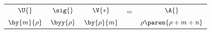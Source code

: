 \begin{table}[htdp]
\begin{center}
\begin{tabular}{ccccc}
%
  $\U{}$ & $\sig{}$ & $\V{*}$ & = & $\A{}$ \\
%
  $\by{m}{\rho}$ & $\byy{\rho}$ & $\by{\rho}{m}$ && $\rho \paren{\rho + m + n} $
%
\end{tabular}
\end{center}
\label{tab:camille:counting pixels}
\end{table}

\endinput